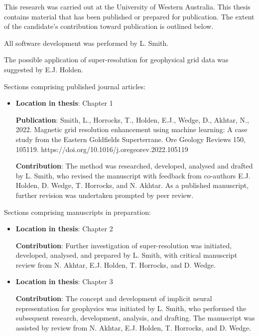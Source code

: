 \documentclass[manuscript.tex]{subfiles}
\begin{document}
This research was carried out at the University of Western Australia.
This thesis contains material that has been published or prepared for publication.
The extent of the candidate's contribution toward publication is outlined below.

\smallskip{}
\noindent{}All software development was performed by L. Smith.

\noindent{}The possible application of super-resolution for geophysical grid data was suggested by E.J. Holden.

\medskip{}
\noindent{}Sections comprising published journal articles:
\begin{itemize}
      \item{}\textbf{Location in thesis}: Chapter 1

            \textbf{Publication}: Smith, L., Horrocks, T., Holden, E.J., Wedge, D., Akhtar, N., 2022. Magnetic grid resolution enhancement using machine learning: A case study from the Eastern Goldfields Superterrane. Ore Geology Reviews 150, 105119. https://doi.org/10.1016/j.oregeorev.2022.105119

            \textbf{Contribution}: The method was researched, developed, analysed and drafted by L. Smith, who revised the manuscript with feedback from co-authors E.J. Holden, D. Wedge, T. Horrocks, and N. Akhtar.
            As a published manuscript, further revision was undertaken prompted by peer review.
\end{itemize}

\noindent{}Sections comprising manuscripts in preparation:
\begin{itemize}
      \item{}
            \textbf{Location in thesis}: Chapter 2

            \textbf{Contribution}: Further investigation of super-resolution was initiated, developed, analysed, and prepared by L. Smith, with critical manuscript review from N. Akhtar, E.J. Holden, T. Horrocks, and D. Wedge.


      \item{}
            \textbf{Location in thesis}: Chapter 3

            \textbf{Contribution}: The concept and development of implicit neural representation for geophysics was initiated by L. Smith, who performed the subsequent research, development, analysis, and drafting. The manuscript was assisted by review from N. Akhtar, E.J. Holden, T. Horrocks, and D. Wedge.

\end{itemize}
\end{document}
